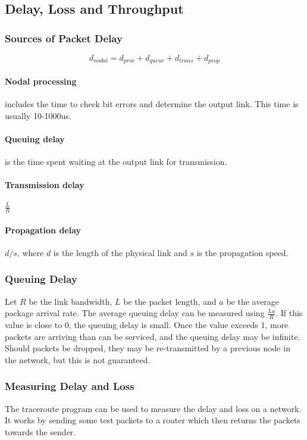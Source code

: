 \documentclass[12pt,titlepage]{article}
\begin{document}
    \subsection{Delay, Loss and Throughput}
      \subsubsection{Sources of Packet Delay}
        $$d_{nodal} = d_{proc} + d_{queue} + d_{trans} + d_{prop}$$
      
        \paragraph{Nodal processing} includes the time to check bit errors and determine the output link. This time is usually 10-1000us.

        \paragraph{Queuing delay} is the time spent waiting at the output link for transmission.

        \paragraph{Transmission delay} $\frac{L}{R}$

        \paragraph{Propagation delay} $d/s$, where $d$ is the length of the physical link and $s$ is the propagation speed.

      \subsubsection{Queuing Delay}
        Let $R$ be the link bandwidth, $L$ be the packet length, and $a$ be the average package arrival rate. The average queuing delay
        can be measured using $\frac{La}{R}$. If this value is close to 0, the queuing delay is small. Once the value exceeds 1, more
        packets are arriving than can be serviced, and the queuing delay may be infinite. Should packets be dropped, they may be
        re-transmitted by a previous node in the network, but this is not guaranteed.

      \subsubsection{Measuring Delay and Loss}
        The traceroute program can be used to measure the delay and loss on a network. It works by sending some test packets to a router which
        then returns the packets towards the sender.
\end{document}
